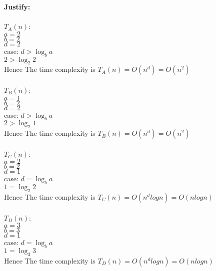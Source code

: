 \documentclass[a4paper]{exam}
\begin{document}
\begin{questions}
\begin{solution}
  \textbf{Justify:}\\
  \\
  $T_A(n)$:
  \\$a=2$
  \\$b=2$
  \\$d=2$
  \\case: $d>\log_b{a}$
  \\$2>\log_2{2}$
  \\Hence The time complexity is $T_A(n) = O(n^d) = O(n^2)$
  \\
  \\
  $T_B(n)$:
  \\$a=1$
  \\$b=2$
  \\$d=2$
  \\case: $d>\log_b{a}$
  \\$2>\log_2{1}$
  \\Hence The time complexity is $T_B(n) = O(n^d) = O(n^2)$
  \\
  \\
  $T_C(n)$:
  \\$a=2$
  \\$b=2$
  \\$d=1$
  \\case: $d=\log_b{a}$
  \\$1=\log_2{2}$
  \\Hence The time complexity is $T_C(n) = O(n^dlogn) = O(nlogn)$
  \\
  \\
  $T_D(n)$:
  \\$a=3$
  \\$b=3$
  \\$d=1$
  \\case: $d=\log_b{a}$ 
  \\$1=\log_3{3}$
  \\Hence The time complexity is $T_D(n) = O(n^dlogn) = O(nlogn)$
  \end{solution}


\end{questions}
\end{document}
